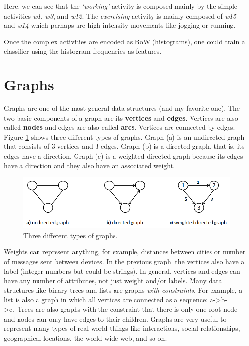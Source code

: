 \documentclass[
  11pt,
]{krantz}
\makeatletter
\newenvironment{kframe}{%
\medskip{}
\setlength{\fboxsep}{.8em}
 \def\at@end@of@kframe{}%
 \ifinner\ifhmode%
  \def\at@end@of@kframe{\end{minipage}}%
  \begin{minipage}{\columnwidth}%
 \fi\fi%
 \def\FrameCommand##1{\hskip\@totalleftmargin \hskip-\fboxsep
 \colorbox{shadecolor}{##1}\hskip-\fboxsep
     \hskip-\linewidth \hskip-\@totalleftmargin \hskip\columnwidth}%
 \MakeFramed {\advance\hsize-\width
   \@totalleftmargin\z@ \linewidth\hsize
   \@setminipage}}%
 {\par\unskip\endMakeFramed%
 \at@end@of@kframe}
\newenvironment{rmdblock}[1]
  {
  \begin{itemize}
  \renewcommand{\labelitemi}{
    \raisebox{-.7\height}[0pt][0pt]{
      {\setkeys{Gin}{width=3em,keepaspectratio}\texttt{[image: images/icons/\#1]}}
    }
  }
  \setlength{\fboxsep}{1em}
  \begin{kframe}
  \item
  }
  {
  \end{kframe}
  \end{itemize}
  }
\newenvironment{rmdinfo}
  {\begin{rmdblock}{info}}
  {\end{rmdblock}}
\makeatother
\begin{document}
Here, we can see that the \emph{`working'} activity is composed mainly by the simple activities \emph{w1}, \emph{w3}, and \emph{w12}. The \emph{exercising} activity is mainly composed of \emph{w15} and \emph{w14} which perhaps are high-intensity movements like jogging or running.

\begin{rmdinfo}
Once the complex activities are encoded as BoW (histograms), one could train a classifier using the histogram frequencies as features.
\end{rmdinfo}

\hypertarget{graphs}{%
\section{Graphs}\label{graphs}}

Graphs are one of the most general data structures (and my favorite one). The two basic components of a graph are its \textbf{vertices} and \textbf{edges}. Vertices are also called \textbf{nodes} and edges are also called \textbf{arcs}. Vertices are connected by edges. Figure \ref{fig:graphTypes} shows three different types of graphs. Graph (a) is an undirected graph that consists of \(3\) vertices and \(3\) edges. Graph (b) is a directed graph, that is, its edges have a direction. Graph (c) is a weighted directed graph because its edges have a direction and they also have an associated weight.

\begin{figure}

{\centering \includegraphics[width=0.7\linewidth]{images/graphs_types} 

}

\caption{Three different types of graphs.}\label{fig:graphTypes}
\end{figure}

Weights can represent anything, for example, distances between cities or number of messages sent between devices. In the previous graph, the vertices also have a label (integer numbers but could be strings). In general, vertices and edges can have any number of attributes, not just weight and/or labels. Many data structures like binary trees and lists are graphs \emph{with constraints}. For example, a list is also a graph in which all vertices are connected as a sequence: a-\textgreater b-\textgreater c.~Trees are also graphs with the constraint that there is only one root node and nodes can only have edges to their children. Graphs are very useful to represent many types of real-world things like interactions, social relationships, geographical locations, the world wide web, and so on.
\end{document}
